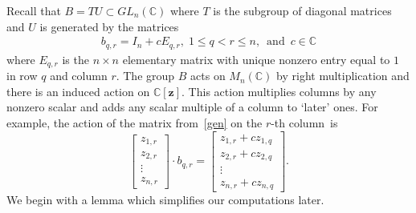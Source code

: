 \documentclass[11pt]{amsart}
\theoremstyle{remark}
\theoremstyle{remark}
\theoremstyle{definition}
\theoremstyle{definition}
\theoremstyle{definition}
\numberwithin{equation}{section}
\newcommand{\C}{\mathbb{C}}           %
\begin{document}
Recall that $B=TU\subset GL_n(\C)$ where $T$ is the subgroup of diagonal matrices and $U$ is generated by the matrices
\begin{eqnarray}\label{gen}
b_{q,r} = I_n+cE_{q,r} ,\; 1\leq q<r \leq n,\, \text{ and }\, c\in \C
\end{eqnarray}
where $E_{q,r}$ is the $n\times n$ elementary matrix with unique nonzero entry equal to $1$ in row $q$ and column $r$. 
The group $B$ acts on $M_n(\C)$ by right multiplication and there is an induced action on $\C[\mathbf{z}]$. This action multiplies columns by any nonzero scalar and adds any scalar multiple of a column to `later' ones.  For example, the action of the matrix from~\eqref{gen} on the $r$-th column~is 
\[
\begin{bmatrix} z_{1,r}\\z_{2,r} \\ \vdots \\ z_{n,r} \end{bmatrix} \cdot b_{q,r} = \begin{bmatrix}  z_{1,r} + cz_{1,q}\\ z_{2,r} + cz_{2,q} \\ \vdots \\ z_{n,r} + cz_{n,q} \end{bmatrix}.
\]
We begin with a lemma which simplifies our computations later.
\end{document}
